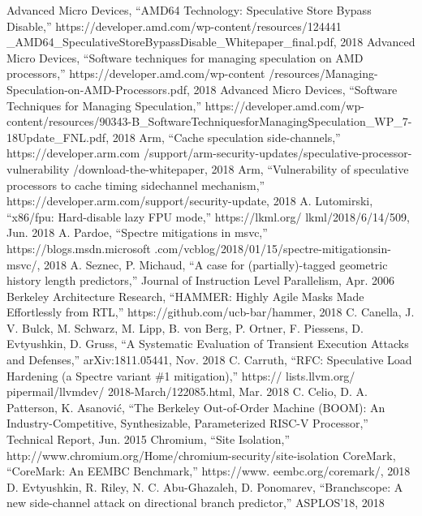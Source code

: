 \begin{thebibliography}{00}
     Advanced Micro Devices, ``AMD64 Technology: Speculative Store Bypass Disable,'' https://developer.amd.com/wp-content/resources/124441 \_AMD64\_SpeculativeStoreBypassDisable\_Whitepaper\_final.pdf, 2018
     Advanced Micro Devices, ``Software techniques for managing speculation on AMD processors,'' https://developer.amd.com/wp-content /resources/Managing-Speculation-on-AMD-Processors.pdf, 2018
     Advanced Micro Devices, ``Software Techniques for Managing Speculation,'' https://developer.amd.com/wp-content/resources/90343-B\_SoftwareTechniquesforManagingSpeculation\_WP\_7-18Update\_FNL.pdf, 2018
     Arm, ``Cache speculation side-channels,'' https://developer.arm.com /support/arm-security-updates/speculative-processor-vulnerability /download-the-whitepaper, 2018
     Arm, ``Vulnerability of speculative processors to cache timing sidechannel mechanism,'' https://developer.arm.com/support/security-update, 2018
     A. Lutomirski, ``x86/fpu: Hard-disable lazy FPU mode,'' https://lkml.org/ lkml/2018/6/14/509, Jun. 2018
     A. Pardoe, ``Spectre mitigations in msvc,'' https://blogs.msdn.microsoft .com/vcblog/2018/01/15/spectre-mitigationsin-msvc/, 2018
     A. Seznec, P. Michaud, ``A case for (partially)-tagged geometric history length predictors,'' Journal of Instruction Level Parallelism, Apr. 2006
     Berkeley Architecture Research, ``HAMMER: Highly Agile Masks Made Effortlessly from RTL,'' https://github.com/ucb-bar/hammer, 2018
     C. Canella, J. V. Bulck, M. Schwarz, M. Lipp, B. von Berg, P. Ortner, F. Piessens, D. Evtyushkin, D. Gruss, ``A Systematic Evaluation of Transient Execution Attacks and Defenses,'' arXiv:1811.05441, Nov. 2018
     C. Carruth, ``RFC: Speculative Load Hardening (a Spectre variant \#1 mitigation),'' https:// lists.llvm.org/ pipermail/llvmdev/ 2018-March/122085.html, Mar. 2018
     C. Celio, D. A. Patterson, K. Asanović, ``The Berkeley Out-of-Order Machine (BOOM): An Industry-Competitive, Synthesizable, Parameterized RISC-V Processor,'' Technical Report, Jun. 2015
     Chromium, ``Site Isolation,'' http://www.chromium.org/Home/chromium-security/site-isolation
     CoreMark, ``CoreMark: An EEMBC Benchmark,'' https://www. eembc.org/coremark/, 2018
     D. Evtyushkin, R. Riley, N. C. Abu-Ghazaleh, D. Ponomarev, ``Branchscope: A new side-channel attack on directional branch predictor,'' ASPLOS’18, 2018

\end{thebibliography}

